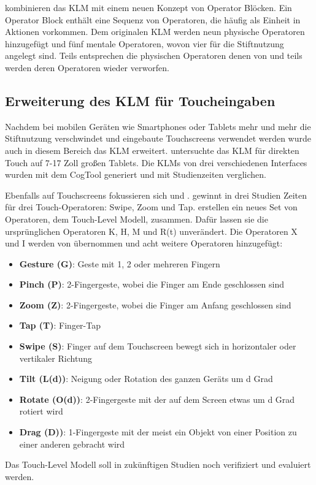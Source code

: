 \citet{Li_2010} kombinieren das KLM mit einem neuen Konzept von Operator Blöcken. 
Ein Operator Block enthält eine Sequenz von Operatoren, die häufig als Einheit in Aktionen vorkommen. 
Dem originalen KLM werden neun physische Operatoren hinzugefügt und fünf mentale Operatoren, wovon vier für die Stiftnutzung angelegt sind. 
Teils entsprechen die physischen Operatoren denen von \citet{Holleis_2007} und teils werden deren Operatoren wieder verworfen. 

\subsection[KLM für Touch]{Erweiterung des KLM für Toucheingaben}
Nachdem bei mobilen Geräten wie Smartphones oder Tablets mehr und mehr die Stiftnutzung verschwindet und eingebaute Touchscreens verwendet werden wurde auch in diesem Bereich das KLM erweitert. 
\citet{Abdulin_2011} untersuchte das KLM für direkten Touch auf 7-17 Zoll großen Tablets. 
Die KLMs von drei verschiedenen Interfaces wurden mit dem CogTool generiert und mit Studienzeiten verglichen. 

Ebenfalls auf Touchscreens fokussieren sich \citet{ElBatran_2014} und \citet{Rice_2014}. \citet{ElBatran_2014} gewinnt in drei Studien Zeiten für drei Touch-Operatoren: Swipe, Zoom und Tap. \citet{Rice_2014} erstellen ein neues Set von Operatoren, dem Touch-Level Modell, zusammen. 
Dafür lassen sie die ursprünglichen Operatoren K, H, M und R(t) unverändert. 
Die Operatoren X und I werden von \citet{Holleis_2007} übernommen und acht weitere Operatoren hinzugefügt: 
\begin{itemize}
	\item \textbf{Gesture (G)}: Geste mit 1, 2 oder mehreren Fingern
	\item \textbf{Pinch (P)}: 2-Fingergeste, wobei die Finger am Ende geschlossen sind
	\item \textbf{Zoom (Z)}: 2-Fingergeste, wobei die Finger am Anfang geschlossen sind
	\item \textbf{Tap (T)}: Finger-Tap
	\item \textbf{Swipe (S)}: Finger auf dem Touchscreen bewegt sich in horizontaler oder vertikaler Richtung
	\item \textbf{Tilt (L(d))}: Neigung oder Rotation des ganzen Geräts um d Grad
	\item \textbf{Rotate (O(d))}: 2-Fingergeste mit der auf dem Screen etwas um d Grad rotiert wird
	\item \textbf{Drag (D))}: 1-Fingergeste mit der meist ein Objekt von einer Position zu einer anderen gebracht wird
\end{itemize}
Das Touch-Level Modell soll in zukünftigen Studien noch verifiziert und evaluiert werden.
